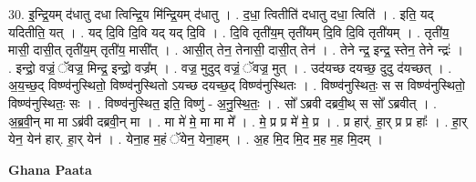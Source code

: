 \documentclass[17pt]{extarticle}
\begin{document}
30. इ॒न्द्रि॒यम् द॑धातु दधा त्विन्द्रि॒य मि॑न्द्रि॒यम् द॑धातु । . द॒धा॒ त्वितीति॑ दधातु दधा॒ त्विति॑ । . इति॒ यद् यदितीति॒ यत् । . यद् दि॒वि दि॒वि यद् यद् दि॒वि । . दि॒वि तृती॑य॒म् तृती॑यम् दि॒वि दि॒वि तृती॑यम् । . तृती॑य॒ मासी॒ दासी॒त् तृती॑य॒म् तृती॑य॒ मासी᳚त् । . आसी॒त् तेन॒ तेनासी॒ दासी॒त् तेन॑ । . तेने न्द्र॒ इन्द्र॒ स्तेन॒ तेने न्द्रः॑ । . इन्द्रो॒ वज्रं॒ ॅवज्र॒ मिन्द्र॒ इन्द्रो॒ वज्र᳚म् । . वज्र॒ मुदुद् वज्रं॒ ॅवज्र॒ मुत् । . उद॑यच्छ दयच्छ॒ दुदु द॑यच्छत् । . अ॒य॒च्छ॒द् विष्ण्व॑नुस्थितो॒ विष्ण्व॑नुस्थितो ऽयच्छ दयच्छ॒द् विष्ण्व॑नुस्थितः । . विष्ण्व॑नुस्थितः॒ स स विष्ण्व॑नुस्थितो॒ विष्ण्व॑नुस्थितः॒ सः । . विष्ण्व॑नुस्थित॒ इति॒ विष्णु॑ - अ॒नु॒स्थि॒तः॒ । . सो᳚ ऽब्रवी दब्रवी॒थ् स सो᳚ ऽब्रवीत् । . अ॒ब्र॒वी॒न् मा मा ऽब्र॑वी दब्रवी॒न् मा । . मा मे॑ मे॒ मा मा मे᳚ । . मे॒ प्र प्र मे॑ मे॒ प्र । . प्र हार्॑. हा॒र् प्र प्र हाः᳚ । . हा॒र् येन॒ येन॑ हार्. हा॒र् येन॑ । . येना॒ह म॒हं ॅयेन॒ येना॒हम् । . अ॒ह मि॒द मि॒द म॒ह म॒ह मि॒दम् । \newline

\textbf{Ghana Paata } \newline
\end{document}
